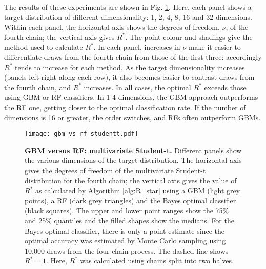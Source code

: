 \documentclass{article}
\begin{document}
The results of these experiments are shown in Fig. \ref{fig:gbm_vs_rf_studdentt}. Here, each panel shows a target distribution of different dimensionality: 1, 2, 4, 8, 16 and 32 dimensions. Within each panel, the horizontal axis shows the degrees of freedom, $\nu$, of the fourth chain; the vertical axis gives $R^*$. The point colour and shadings give the method used to calculate $R^*$. In each panel, increases in $\nu$ make it easier to differentiate draws from the fourth chain from those of the first three: accordingly $R^*$ tends to increase for each method. As the target dimensionality increases (panels left-right along each row), it also becomes easier to contrast draws from the fourth chain, and $R^*$ increases. In all cases, the optimal $R^*$ exceeds those using GBM or RF classifiers. In 1-4 dimensions, the GBM approach outperforms the RF one, getting closer to the optimal classification rate. If the number of dimensions is 16 or greater, the order switches, and RFs often outperform GBMs.


\begin{figure}[!htb]
	\centerline{\texttt{[image: gbm\_vs\_rf\_studentt.pdf]}}
	\caption{\textbf{GBM versus RF: multivariate Student-t.} Different panels show the various dimensions of the target distribution. The horizontal axis gives the degrees of freedom of the multivariate Student-t distribution for the fourth chain; the vertical axis gives the value of $R^*$ as calculated by Algorithm \ref{alg:R_star} using a GBM (light grey points), a RF (dark grey triangles) and the Bayes optimal classifier (black squares). The upper and lower point ranges show the 75\% and 25\% quantiles and the filled shapes show the medians. For the Bayes optimal classifier, there is only a point estimate since the optimal accuracy was estimated by Monte Carlo sampling using 10,000 draws from the four chain process. The dashed line shows $R^*=1$. Here, $R^*$ was calculated using chains split into two halves.}
	\label{fig:gbm_vs_rf_studdentt}
\end{figure}
\color{black}


 
\end{document}
